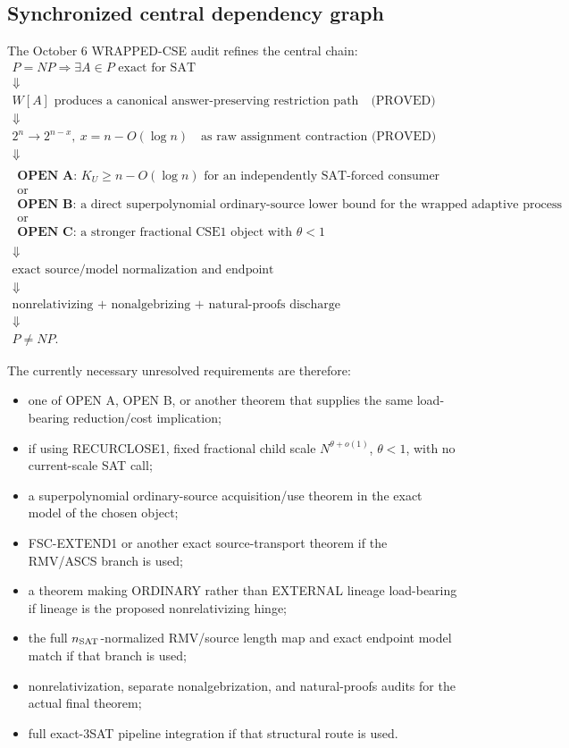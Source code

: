 \documentclass[11pt]{article}
\theoremstyle{plain}
\theoremstyle{definition}
\theoremstyle{remark}
\begin{document}
\subsection{Synchronized central dependency graph}

The October 6 WRAPPED-CSE audit refines the central chain:
\[
\boxed{
\begin{array}{c}
P=NP
\Rightarrow
\exists A\in P\text{ exact for SAT}\\
\Downarrow\\
W[A]\text{ produces a canonical answer-preserving restriction path}
\quad\text{(PROVED)}\\
\Downarrow\\
2^n\to2^{n-x},\ x=n-O(\log n)
\quad\text{as raw assignment contraction (PROVED)}\\
\Downarrow\\
\begin{array}{c}
\textbf{OPEN A: }K_U\ge n-O(\log n)
\text{ for an independently SAT-forced consumer}\\
\text{or}\\
\textbf{OPEN B: }\text{a direct superpolynomial ordinary-source lower bound}
\text{ for the wrapped adaptive process}\\
\text{or}\\
\textbf{OPEN C: }\text{a stronger fractional CSE1 object with }\theta<1
\end{array}\\
\Downarrow\\
\text{exact source/model normalization and endpoint}\\
\Downarrow\\
\text{nonrelativizing + nonalgebrizing + natural-proofs discharge}\\
\Downarrow\\
P\ne NP.
\end{array}}
\]

The currently necessary unresolved requirements are therefore:
\begin{itemize}[leftmargin=1.4em]
\item one of OPEN A, OPEN B, or another theorem that supplies the same
load-bearing reduction/cost implication;
\item if using RECURCLOSE1, fixed fractional child scale
\(N^{\theta+o(1)}\), \(\theta<1\), with no current-scale SAT call;
\item a superpolynomial ordinary-source acquisition/use theorem in the exact
model of the chosen object;
\item FSC-EXTEND1 or another exact source-transport theorem if the RMV/ASCS
branch is used;
\item a theorem making ORDINARY rather than EXTERNAL lineage load-bearing if
lineage is the proposed nonrelativizing hinge;
\item the full \(n_{\rm SAT}\)-normalized RMV/source length map and exact
endpoint model match if that branch is used;
\item nonrelativization, separate nonalgebrization, and natural-proofs audits
for the actual final theorem;
\item full exact-3SAT pipeline integration if that structural route is used.
\end{itemize}
\end{document}
